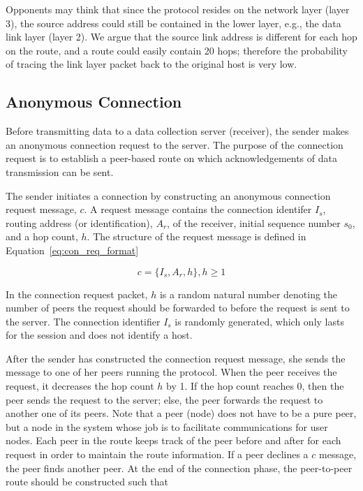 Opponents may think that since the protocol resides on the network
layer (layer 3), the source address could still be contained in
the lower layer, e.g., the data link layer (layer 2). We argue
that the source link address is different for each hop on the
route, and a route could easily contain 20 hops; therefore the
probability of tracing the link layer packet back to the original
host is very low.

\subsection{Anonymous Connection}\label{anonymous_connection}

Before transmitting data to a data collection server (receiver),
the sender makes an anonymous connection request to the server.
The purpose of the connection request is to establish a peer-based
route on which acknowledgements of data transmission can be sent.

The sender initiates a connection by constructing an anonymous
connection request message, $c$. A request message contains the
connection identifer $I_s$, routing address (or identification),
$A_r$, of the receiver, initial sequence number $s_0$, and a hop
count, $h$. The structure of the request message is defined in
Equation~\ref{eq:con_req_format}

\begin{equation}\label{eq:con_req_format}
c = \{I_s, A_r, h\}, h \geq 1
\end{equation}

In the connection request packet, $h$ is a random natural number
denoting the number of peers the request should be forwarded to
before the request is sent to the server. The connection
identifier $I_s$ is randomly generated, which only lasts for the
session and does not identify a host.

After the sender has constructed the connection request message,
she sends the message to one of her peers running the protocol.
When the peer receives the request, it decreases the hop count $h$
by 1. If the hop count reaches 0, then the peer sends the request
to the server; else, the peer forwards the request to another one
of its peers. Note that a peer (node) does not have to be a pure
peer, but a node in the system whose job is to facilitate
communications for user nodes. Each peer in the route keeps track
of the peer before and after for each request in order to maintain
the route information. If a peer declines a $c$ message, the peer
finds another peer. At the end of the connection phase, the
peer-to-peer route should be constructed such that

